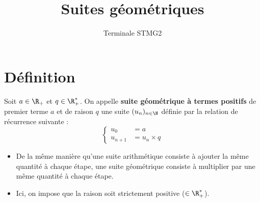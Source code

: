 \documentclass{article}
\title{Suites géométriques}
\date{}
\author{Terminale STMG2}
\begin{document}
\maketitle

\section{Définition}
\begin{tcolorbox}
\begin{definition}
Soit $a \in \R_+$ et $q \in \R_+^*$. On appelle \textbf{suite géométrique à termes positifs} de premier terme $a$ et de raison $q$ une suite $(u_n)_{n \in \N}$ définie par la relation de récurrence suivante :
\begin{equation*}
\begin{cases}
u_0 &= a\\
u_{n+1} &= u_n \times q
\end{cases}
\end{equation*}
\end{definition}
\end{tcolorbox}
\begin{remark}
\hfill
\begin{itemize}
\item De la même manière qu'une suite arithmétique consiste à ajouter la même quantité à chaque étape, une suite géométrique consiste à multiplier par une même quantité à chaque étape.
\item Ici, on impose que la raison soit strictement positive ($\in \R_+^*$).
\end{itemize}
\end{remark}
\end{document}
